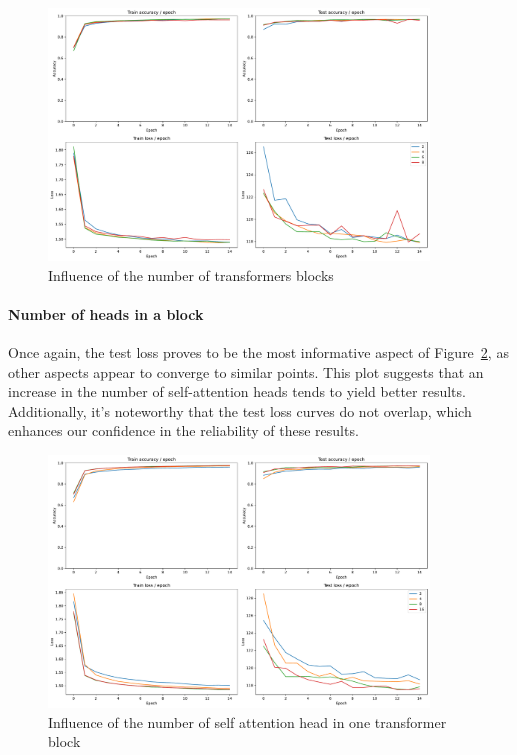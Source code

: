 \begin{figure}[H]
    \centering
    \includegraphics*[width=0.9\textwidth]{figs/Transformers/nb_block_influence.pdf}
    \caption{Influence of the number of transformers blocks}
    \label{fig:nb_block_influence}
\end{figure}

\paragraph{Number of heads in a block}
Once again, the test loss proves to be the most informative aspect of Figure~\ref{fig:num_heads_influence}, as other aspects appear to converge to similar points. This plot suggests that an increase in the number of self-attention heads tends to yield better results. Additionally, it's noteworthy that the test loss curves do not overlap, which enhances our confidence in the reliability of these results.

\begin{figure}[H]
    \centering
    \includegraphics*[width=0.9\textwidth]{figs/Transformers/num_heads_influence.pdf}
    \caption{Influence of the number of self attention head in one transformer block }
    \label{fig:num_heads_influence}
\end{figure}

